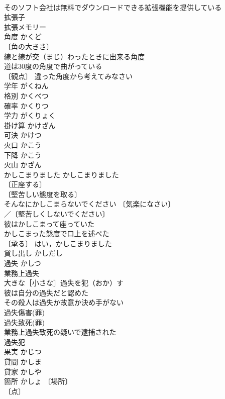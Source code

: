 \documentclass[8pt]{extreport}
\begin{document}
\begin{CJK}{UTF8}{min}
\\	そのソフト会社は無料でダウンロードできる拡張機能を提供している 
\\	拡張子 
\\	拡張メモリー 
\\	角度	かくど	
\\	〔角の大きさ〕
\\	線と線が交（まじ）わったときに出来る角度 
\\	道は30度の角度で曲がっている 
\\	〔観点〕 違った角度から考えてみなさい 
\\	学年	がくねん	
\\	格別	かくべつ	
\\	確率	かくりつ	
\\	学力	がくりょく	
\\	掛け算	かけざん	
\\	可決	かけつ	
\\	火口	かこう	
\\	下降	かこう	
\\	火山	かざん	
\\	かしこまりました	かしこまりました	
\\	〔正座する〕
\\	〔堅苦しい態度を取る〕
\\	そんなにかしこまらないでください 〔気楽になさい〕
\\	／〔堅苦しくしないでください〕
\\	彼はかしこまって座っていた 
\\	かしこまった態度で口上を述べた 
\\	〔承る〕 はい，かしこまりました 
\\	貸し出し	かしだし	
\\	過失	かしつ	
\\	業務上過失 
\\	大きな［小さな］過失を犯（おか）す 
\\	彼は自分の過失だと認めた 
\\	その殺人は過失か故意か決め手がない 
\\	過失傷害(罪) 
\\	過失致死(罪) 
\\	業務上過失致死の疑いで逮捕された 
\\	過失犯 
\\	果実	かじつ	
\\	貸間	かしま	
\\	貸家	かしや	
\\	箇所	かしょ	〔場所〕
\\	〔点〕

\end{CJK}
\end{document}
